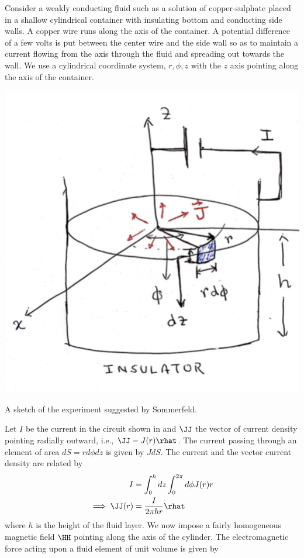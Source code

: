 Consider a weakly conducting fluid such as a solution
of copper-sulphate placed in a shallow cylindrical container with
insulating bottom and conducting side walls. A copper wire runs along
the axis of the container. A potential difference of a few volts is
put between the center wire and the side wall so as to maintain a
current flowing from the axis through the fluid and spreading out
towards the wall.
We use a cylindrical coordinate system, $r,\phi,z$ with the $z$ axis
pointing along the axis of the container. 
\begin{marginfigure}
\includegraphics{figures/SomExp.png}
\caption{A sketch of the experiment suggested by Sommerfeld. }
\label{fig:SomExp}
\end{marginfigure}
 Let $I$ be the current in the circuit shown in  and $\JJ$ the vector of
current density pointing radially outward, i.e., $\JJ = J(r)\rhat$. 
The current passing through an element of
area $dS = rd\phi dz$ is given by $JdS$.
 The current and the vector
current density are related by 
\begin{subequations}
\begin{align}
I &= \int_{0}^{h}dz\int_{0}^{2\pi} d\phi J(r) r \\
\implies  \JJ(r) &= \frac{I}{2\pi h r}\rhat
\end{align}
\end{subequations}
where $h$ is the height of the fluid layer. 
We now impose a fairly homogeneous magnetic field $\HH$ 
pointing along the axis of the cylinder. The electromagnetic force
acting upon a fluid element of unit volume is given by 

